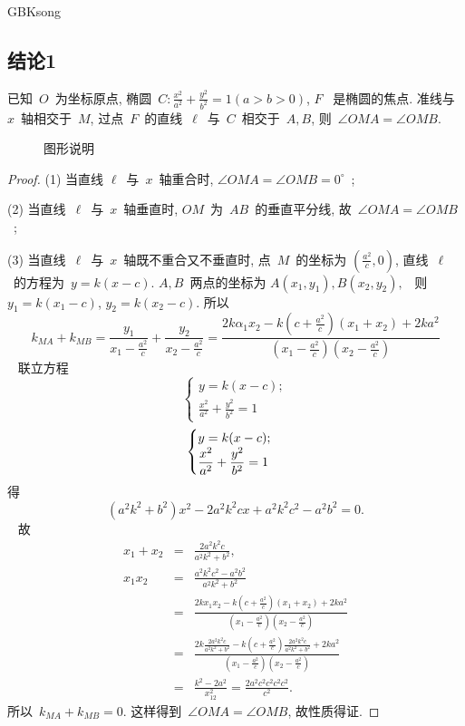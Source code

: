 \documentclass[a4paper, 12pt, twoside]{ctexart}
\begin{document}
\begin{CJK*}{GBK}{song}
\subsection{结论1}
    \begin{propt}\label{propt1}
    已知~$O$~为坐标原点,  椭圆~$C:  \frac{x^2}{a^2}+\frac{y^2}{b^2}=1(a>b>0)$, $F$~ 是椭圆的焦点. 准线与~$x$~轴相交于~$M$, 过点~$F$~的直线~$\ell$~与~$C$~相交于~$A,B$, 则~$\angle OMA=\angle OMB$.
    \end{propt}
    \begin{figure}
    \centering
    \caption{\label{fig3} 图形说明}
    \end{figure}
    \begin{proof}
    (1) 当直线 $\ell$~与~$x$~轴重合时, $\angle O M A=\angle O M B=0^{\circ}$~;

    (2) 当直线~$\ell$~与~$x$~轴垂直时, $OM$~为~$AB$~的垂直平分线, 故~$\angle O M A=\angle O M B$~;

    (3) 当直线~$\ell$~与~$x$~轴既不重合又不垂直时, 点~$M$~的坐标为 $(\frac{a^2}c,0)$, 直线~$\ell$~的方程为~$y=k(x-c)$. $A,B$~两点的坐标为 $A(x_1, y_1), B(x_2,y_2),$~ 则~$y_1=k(x_1-c)$, $ y_2=k(x_2-c)$. 所以
    $$~k_{M A}+k_{MB} =\frac{y_{1}}{x_1-\frac{a^2}{c}} +\frac{y_{2}}{x_2-\frac{a^2}{c}}=\frac{2 k \alpha_{1} x_2-k\left(c+\frac{a^2}{c}\right)\left(x_1+x_2\right)+2 k a^2}{\left(x_1-\frac{a^2}{c}\right)\left(x_2-\frac{a^2}{c}\right)}~$$~
    联立方程
        $$~\left\{\!\!\!\begin{array}{l}
            y=k(x-c); \\
            \frac{x^2}{a^2}+\frac{y^2}{b^2}=1
        \end{array}\right.~$$
        $$\begin{cases}
          y=k(x-c); \\
          \displaystyle\frac{x^2}{a^2}+\frac{y^2}{b^2}=1
        \end{cases}$$
    得
        $$~(a^2 k^2+b^2)x^2-2 a^2 k^2cx+a^2 k^2c^2-a^2b^2=0.~$$~
    故
        \begin{eqnarray*}
            x_1+x_2&=&\frac{2a^2k^2c}{a^2k^2+b^2},\\
            x_1x_2&=&
                \frac{a^2 k^2 c^2-a^2 b^2}{a^2 k^2+b^2} \\
                &=&\frac{2 k x_1 x_2-k\left(c+\frac{a^2}{c}\right)\left(x_1+x_2\right)+2 ka^2}{\left(x_1-\frac{a^2}{c}\right)\left(x_2-\frac{a^2}{c}\right)} \\
                &=&\frac{2 k \frac{2 a^2 k^2 c}{a^2 k^2+b^2}-k\left(c+\frac{a^2}{c}\right) \frac{2 a^2 k^2 c}{a^2 k^2+b^2}+2 k a^2}{\left(x_1-\frac{a^2}{c}\right)\left(x_2-\frac{a^2}{c}\right)} \\
            &=&\frac{k^2-2 a^2}{x_{12}^2}=\frac{2 a^2 c^2 c^2 c^2 c^2}
            {c^2}.
        \end{eqnarray*}
    所以~$k_{M A}+k_{M B}=0$. 这样得到~$\angle O M A=\angle O M B$, 故性质得证.
\end{proof}


\end{CJK*}
\end{document}
